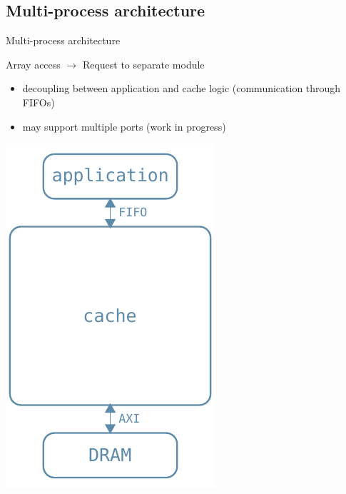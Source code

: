 \documentclass{beamer}
\begin{document}
\subsection{Multi-process architecture}
\begin{frame}{Multi-process architecture}
	\begin{minipage}{.7\textwidth}
		\begin{center}
			Array access $\rightarrow$ Request to separate module
		\end{center}
		\begin{itemize}
			\item decoupling between application and cache logic
				(communication through FIFOs)
			\item may support multiple ports (work in progress)
		\end{itemize}
	\end{minipage}
	\begin{minipage}{.28\textwidth}
		\begin{center}
			\includegraphics[width=.9\textwidth,height=.9\textheight,keepaspectratio]{complete_arch.pdf}
		\end{center}
	\end{minipage}
\end{frame}
\end{document}
